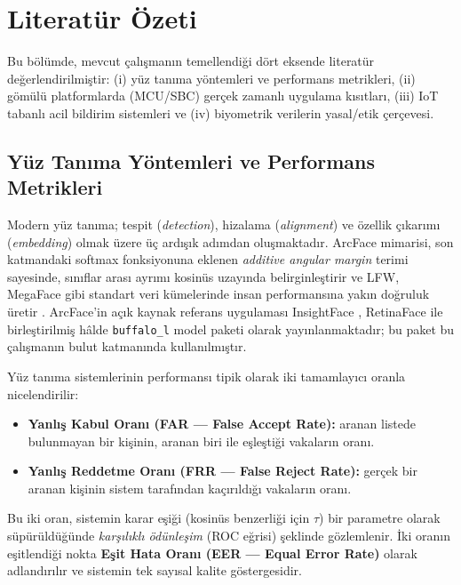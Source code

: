 \chapter{Literatür Özeti}
\label{ch:literatur}

Bu bölümde, mevcut çalışmanın temellendiği dört eksende literatür
değerlendirilmiştir: (i) yüz tanıma yöntemleri ve performans metrikleri,
(ii) gömülü platformlarda (MCU/SBC) gerçek zamanlı uygulama kısıtları,
(iii) IoT tabanlı acil bildirim sistemleri ve (iv) biyometrik verilerin
yasal/etik çerçevesi.

\section{Yüz Tanıma Yöntemleri ve Performans Metrikleri}

Modern yüz tanıma; tespit (\emph{detection}), hizalama (\emph{alignment})
ve özellik çıkarımı (\emph{embedding}) olmak üzere üç ardışık adımdan
oluşmaktadır. ArcFace mimarisi, son katmandaki softmax fonksiyonuna eklenen
\emph{additive angular margin} terimi sayesinde, sınıflar arası ayrımı
kosinüs uzayında belirginleştirir ve LFW, MegaFace gibi standart veri
kümelerinde insan performansına yakın doğruluk üretir \cite{deng2019arcface}.
ArcFace'in açık kaynak referans uygulaması InsightFace
\cite{guo2021insightface}, RetinaFace \cite{deng2020retinaface} ile
birleştirilmiş hâlde \texttt{buffalo\_l} model paketi olarak
yayınlanmaktadır; bu paket bu çalışmanın bulut katmanında kullanılmıştır.

Yüz tanıma sistemlerinin performansı tipik olarak iki tamamlayıcı oranla
nicelendirilir:

\begin{itemize}
    \item \textbf{Yanlış Kabul Oranı (FAR --- False Accept Rate):} aranan
          listede bulunmayan bir kişinin, aranan biri ile eşleştiği vakaların
          oranı.
    \item \textbf{Yanlış Reddetme Oranı (FRR --- False Reject Rate):}
          gerçek bir aranan kişinin sistem tarafından kaçırıldığı vakaların
          oranı.
\end{itemize}

Bu iki oran, sistemin karar eşiği (kosinüs benzerliği için $\tau$) bir
parametre olarak süpürüldüğünde \emph{karşılıklı ödünleşim} (ROC eğrisi)
şeklinde gözlemlenir. İki oranın eşitlendiği nokta \textbf{Eşit Hata
Oranı (EER --- Equal Error Rate)} olarak adlandırılır ve sistemin tek
sayısal kalite göstergesidir.

